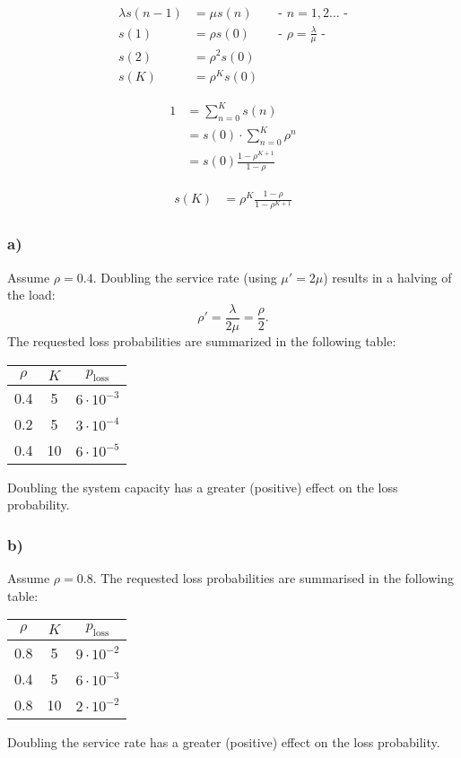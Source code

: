 \begin{align*}
\lambda s\left(n-1\right)&=\mu s\left(n\right)&& \text{-  $n=1,2\ldots $ -}\\
s\left(1\right)&=\rho s\left(0\right) && \text{-  $\rho =\frac{\lambda }{\mu }$ -}\\
s\left(2\right)&=\rho ^{2}s\left(0\right)\\
s\left(K\right)&=\rho ^{K}s\left(0\right)
\end{align*}

\begin{align*}
1&=\sum _{{n=0}}^{K}s\left(n\right)\\
&= s(0) \cdot \sum_{{n=0}}^{K} \rho^n\\
&= s(0) \frac{1-\rho ^{{K+1}}}{1-\rho }
\end{align*}

\begin{align*}
s(K)&= \rho ^{K}\frac{1-\rho }{1-\rho ^{{K+1}}}
\end{align*}

\subsubsection*{ a) }

Assume $\rho=0.4$.
Doubling the service rate (using $\mu' = 2 \mu$) results in a halving of the load:
\[
\rho' = \frac{\lambda}{2 \mu} = \frac{\rho}{2}.
\]
The requested loss probabilities are summarized in the following table:
\begin{table}[H]
\centering
\begin{tabular}{ccc}
$\rho$  & $K$   & $p_{\text{loss}}$ \\ \hline
0.4     & 5     & $6 \cdot 10^{-3}$ \\
0.2     & 5     & $3 \cdot 10^{-4}$ \\
0.4     & 10    & $6 \cdot 10^{-5}$
\end{tabular}
\end{table}
Doubling the system capacity has a greater (positive) effect on the loss probability.

\subsubsection*{ b) }

Assume $\rho=0.8$.
The requested loss probabilities are summarised in the following table:
\begin{table}[H]
\centering
\begin{tabular}{ccc}
$\rho$  & $K$   & $p_{\text{loss}}$ \\ \hline
0.8     & 5     & $9 \cdot 10^{-2}$ \\
0.4     & 5     & $6 \cdot 10^{-3}$ \\
0.8     & 10    & $2 \cdot 10^{-2}$
\end{tabular}
\end{table}
Doubling the service rate has a greater (positive) effect on the loss probability.

